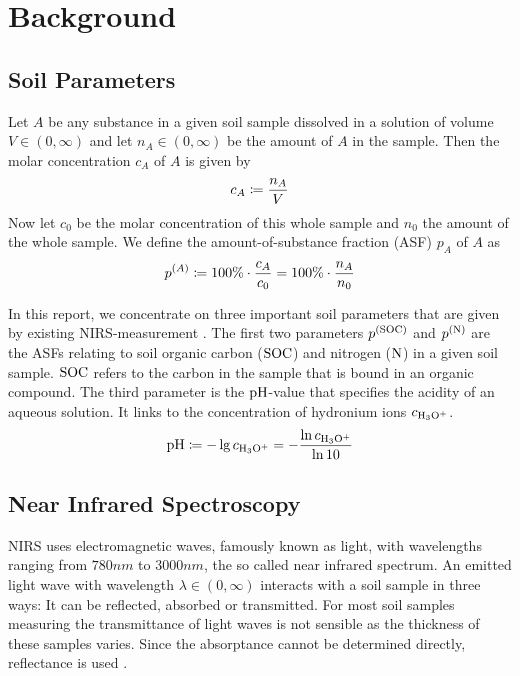 \section{Background}
\label{sec:background}
	
	\subsection{Soil Parameters}
	\label{ssec:soil-parameters}
	
		Let $A$ be any substance in a given soil sample dissolved in a solution of volume $V\in(0,\infty)$ and let $n_A\in(0,\infty)$ be the amount of $A$ in the sample.
		Then the molar concentration $c_A$ of $A$ is given by
		\[
			c_A \coloneqq \frac{n_A}{V}
		\]
		Now let $c_0$ be the molar concentration of this whole sample and $n_0$ the amount of the whole sample.
		We define the amount-of-substance fraction (ASF) $p_A$ of $A$ as 
		\[
			p^{(A)} \coloneqq 100\%\cdot\frac{c_A}{c_0} = 100\% \cdot\frac{n_A}{n_0}
		\]

		In this report, we concentrate on three important soil parameters that are given by existing NIRS-measurement \cite{agelet:10a, don:a}.
		The first two parameters $p^{\mathrm{(SOC)}}$ and $p^{\mathrm{(N)}}$ are the ASFs relating to soil organic carbon ($\mathrm{SOC}$) and nitrogen ($\mathrm{N}$) in a given soil sample.
		$\mathrm{SOC}$ refers to the carbon in the sample that is bound in an organic compound.
		The third parameter is the $\mathrm{pH}$-value that specifies the acidity of an aqueous solution.
		It links to the concentration of hydronium ions $c_{\mathrm{H_3O^+}}$.
		\[
			\mathrm{pH} \coloneqq -\lg c_{\mathrm{H_3O^+}} = -\frac{\ln c_{\mathrm{H_3O^+}}}{\ln 10}
		\]
	

	\subsection{Near Infrared Spectroscopy}
	\label{ssec:nirs}
	
		NIRS uses electromagnetic waves, \cite[246]{agelet:10a}
		 famously known as light, with wavelengths ranging from $780\unit{nm}$ to $3000\unit{nm}$, the so called near infrared spectrum.
		An emitted light wave with wavelength $\lambda \in (0,\infty)$ interacts with a soil sample in three ways:
		It can be reflected, absorbed or transmitted.
		For most soil samples measuring the transmittance of light waves is not sensible as the thickness of these samples varies.
		Since the absorptance cannot be determined directly, reflectance is used \cite[247-8]{agelet:10a}.
		

